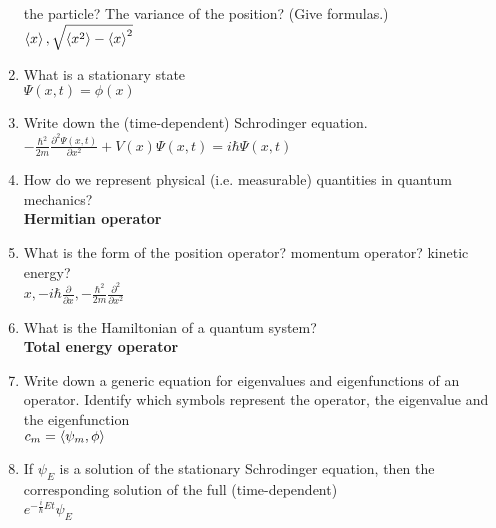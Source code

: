 \documentclass[a4paper]{article}
\begin{document}
\begin{enumerate}
    the particle? The variance of the position? (Give formulas.)
    \\ \textbf{$\braket{x},\sqrt{\braket{x^2}-\braket{x}^2}$}
    \item What is a stationary state
    \\ \textbf{$\Psi(x,t)=\phi(x)$}
    \item Write down the (time-dependent) Schrodinger equation.
    \\ \textbf{$-\frac{\hbar^2}{2m}\frac{\partial^2\Psi(x,t)}{\partial x^2}+V(x)\Psi(x,t)=i\hbar\Psi(x,t)$}
    \item How do we represent physical (i.e. measurable) quantities in quantum mechanics?
    \\ \textbf{Hermitian operator}
    \item What is the form of the position operator? momentum operator? kinetic energy?
    \\ \textbf{$x,-i\hbar\frac{\partial}{\partial x},-\frac{\hbar^2}{2m}\frac{\partial^2}{\partial x^2}$}
    \item What is the Hamiltonian of a quantum system?
    \\ \textbf{Total energy operator}
    \item Write down a generic equation for eigenvalues and eigenfunctions of an operator. Identify which symbols
    represent the operator, the eigenvalue and the eigenfunction
    \\ \textbf{$c_m=\braket{\psi_m,\phi}$}
    \item If $\psi_E$ is a solution of the stationary Schrodinger equation, then the corresponding solution of the full
    (time-dependent) 
    \\ \textbf{$e^{-\frac{i}{\hbar}Et}\psi_E$}
\end{enumerate}
\end{document}
